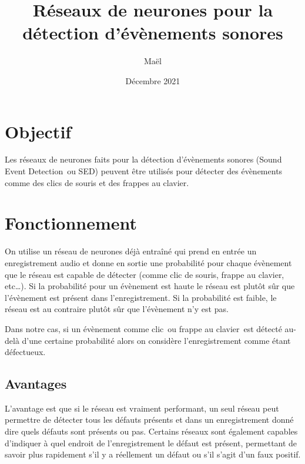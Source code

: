 \documentclass{article}
\title{Réseaux de neurones pour la détection d'évènements sonores}
\author{Maël \bsc{Alet}}
\date{Décembre 2021}
\begin{document}
\maketitle
\tableofcontents

\begin{license}
\end{license}


\newpage


\section{Objectif}

Les réseaux de neurones faits pour la détection d’évènements sonores (\og Sound Event Detection\fg\ ou \og SED\fg) peuvent être utilisés pour détecter des évènements comme des clics de souris et des frappes au clavier.


\section{Fonctionnement}

On utilise un réseau de neurones déjà entraîné qui prend en entrée un enregistrement audio et donne en sortie une probabilité pour chaque évènement que le réseau est capable de détecter (comme \og clic de souris\fg, \og frappe au clavier\fg, etc\ldots). Si la probabilité pour un évènement est haute le réseau est plutôt sûr que l'évènement est présent dans l'enregistrement. Si la probabilité est faible, le réseau est au contraire plutôt sûr que l'évènement n'y est pas.

Dans notre cas, si un évènement comme \og clic\fg\ ou \og frappe au clavier\fg\ est détecté au-delà d’une certaine probabilité alors on considère l’enregistrement comme étant défectueux.


\subsection{Avantages}

L’avantage est que si le réseau est vraiment performant, un seul réseau peut permettre de détecter tous les défauts présents et dans un enregistrement donné dire quels défauts sont présents ou pas. Certains réseaux sont également capables d’indiquer à quel endroit de l’enregistrement le défaut est présent, permettant de savoir plus rapidement s’il y a réellement un défaut ou s’il s’agit d’un faux positif.
\end{document}
